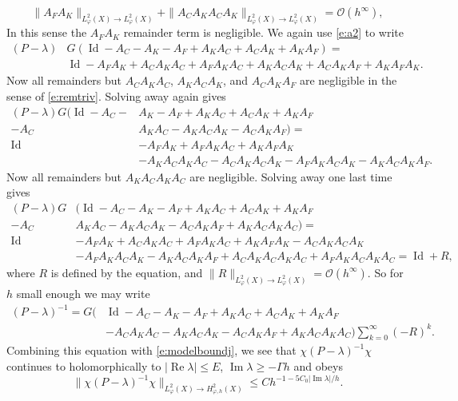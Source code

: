 \documentclass[reqno, 12pt]{amsart}
\newcommand \Oh {\mathcal{O}}
\DeclareMathOperator \re {Re}
\DeclareMathOperator \im {Im}
\DeclareMathOperator \Id {Id}
\theoremstyle{definition}
\numberwithin{equation}{section}
\numberwithin{prop}{section}
\numberwithin{figure}{section}
\begin{document}
\begin{equation}\label{e:remtriv}
  \|A_FA_K \|_{L^2_\varphi(X) \to L^2_\varphi(X)} + \| A_CA_KA_CA_K\|_{L^2_\varphi(X) \to L^2_\varphi(X)} = \Oh(h^\infty),
\end{equation}
In this sense the $A_FA_K$ remainder term  is negligible. We again use \eqref{e:a2} to write
\[\begin{split}
(P - \lambda) &G(\Id - A_C - A_K - A_F +A_KA_C + A_C A_K  +  A_K A_F) = \\
&\Id  - A_FA_K  + A_CA_KA_C + A_FA_KA_C + A_KA_CA_K + A_CA_KA_F + A_KA_FA_K.
\end{split}\]
Now all remainders but  $A_CA_KA_C$, $A_KA_CA_K $, and $A_CA_KA_F$ are negligible in the sense of \eqref{e:remtriv}. Solving away again gives
\[\begin{split}
(P - \lambda) G(\Id - A_C - &A_K - A_F + A_KA_C + A_C A_K + A_K A_F \\- A_C&A_KA_C - A_KA_CA_K -  A_CA_KA_F) = \\
\Id  &- A_FA_K  + A_FA_KA_C + A_KA_FA_K \\&-A_KA_CA_KA_C -  A_CA_KA_CA_K  -  A_FA_KA_CA_K  -  A_KA_CA_KA_F.
\end{split}\]
Now all remainders but $A_KA_CA_KA_C$ are negligible. Solving away one last time gives
\[\begin{split}
(P - \lambda) G&(\Id - A_C - A_K - A_F + A_KA_C + A_C A_K + A_K A_F \\- A_C&A_KA_C - A_KA_CA_K -  A_CA_KA_F + A_KA_CA_KA_C) = \\
\Id  &- A_FA_K   + A_CA_KA_C+ A_FA_KA_C + A_KA_FA_K  -  A_CA_KA_CA_K  \\& -  A_FA_KA_CA_K  -  A_KA_CA_KA_F + A_CA_KA_CA_KA_C + A_FA_KA_CA_KA_C  = \Id + R,
\end{split}\]
where $R$ is defined by the equation, and $\|R\|_{L^2_\varphi(X) \to L^2_\varphi(X)} = \Oh(h^\infty)$. %
So for $h$ small enough we may write
\[\begin{split}
(P-\lambda)^{-1} = G\Big(&\Id - A_C - A_K - A_F + A_KA_C + A_C A_K + A_K A_F\\&  - A_CA_KA_C - A_KA_CA_K -  A_CA_KA_F + A_KA_CA_KA_C\Big)\sum_{k=0}^\infty (-R)^k.
\end{split}\]
Combining this equation with \eqref{e:modelboundj},  we see that $\chi(P-\lambda)^{-1}\chi$  continues to holomorphically to $|\re \lambda| \le E$, $\im \lambda \ge -\Gamma h$ and obeys
\[
\| \chi(P-\lambda)^{-1}\chi\|_{L^2_\varphi(X) \to H^2_{\varphi,h}(X)} \le C h^{-1 - 5C_0|\im \lambda|/h}.
\]
\end{document}
